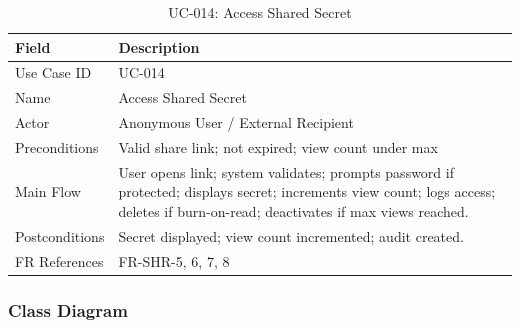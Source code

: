 \documentclass[12pt,a4paper]{article}
\begin{document}
\begin{table}[H]
  \centering
  \small
  \caption{UC-014: Access Shared Secret}
  \begin{tabular}{@{}p{2.4cm}>{\raggedright\arraybackslash}p{10.2cm}@{}}
    \toprule
    \textbf{Field} & \textbf{Description}                                                                                                                                                              \\
    \midrule
    Use Case ID    & UC-014                                                                                                                                                                            \\
    \hline
    Name           & Access Shared Secret                                                                                                                                                              \\
    \hline
    Actor          & Anonymous User / External Recipient                                                                                                                                               \\
    \hline
    Preconditions  & Valid share link; not expired; view count under max                                                                                                                               \\
    \hline
    Main Flow      & User opens link; system validates; prompts password if protected; displays secret; increments view count; logs access; deletes if burn-on-read; deactivates if max views reached. \\
    \hline
    Postconditions & Secret displayed; view count incremented; audit created.                                                                                                                          \\
    \hline
    FR References  & FR-SHR-5, 6, 7, 8                                                                                                                                                                 \\
    \bottomrule
  \end{tabular}
\end{table}

\subsubsection*{Class Diagram}
\end{document}
